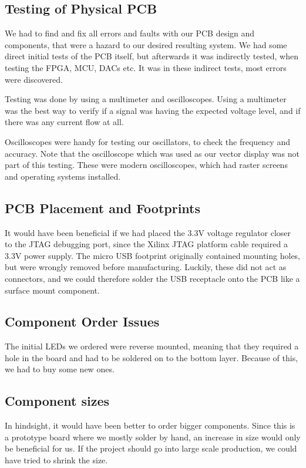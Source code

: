 \subsection{Testing of Physical PCB}
We had to find and fix all errors and faults with our PCB design and components, that were a hazard to our desired resulting system.  
We had some direct initial tests of the PCB itself, but afterwards it was indirectly tested, when testing the FPGA, MCU, DACs etc. It was in these indirect tests, most errors were discovered.

Testing was done by using a multimeter and oscilloscopes. Using a multimeter was the best way to verify if a signal was having the expected voltage level, and if there was any current flow at all.

Oscilloscopes were handy for testing our oscillators, to check the frequency and accuracy. Note that the oscilloscope which was used as our vector display was not part of this testing. These were modern oscilloscopes, which had raster screens and operating systems installed.

\subsection{PCB Placement and Footprints}


It would have been beneficial if we had placed the 3.3V voltage regulator closer to the JTAG debugging port, since the Xilinx JTAG platform cable required a 3.3V power supply.
\newline
\newline
The micro USB footprint originally contained mounting holes, but were wrongly removed before manufacturing. Luckily, these did not act as connectors, and we could therefore solder the USB receptacle onto the PCB like a surface mount component.

\subsection{Component Order Issues}
The initial LEDs we ordered were reverse mounted, meaning that they required a hole in the board and had to be soldered on to the bottom layer. Because of this, we had to buy some new ones.
\newline
\newline

\subsection{Component sizes}
In hindsight, it would have been better to order bigger components. Since this is a prototype board where we mostly solder by hand, an increase in size would only be beneficial for us. If the project should go into large scale production, we could have tried to shrink the size.
